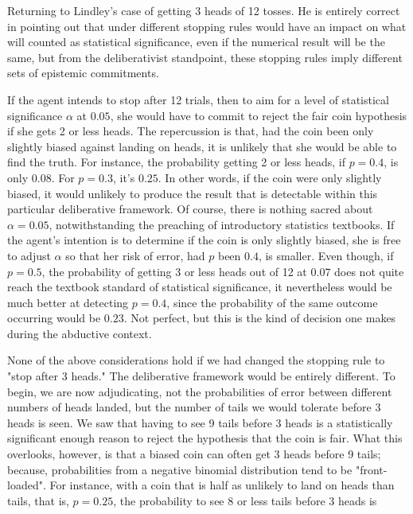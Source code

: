 Returning to Lindley's case of getting 3 heads of 12 tosses. He is
entirely correct in pointing out that under different stopping rules
would have an impact on what will counted as statistical significance,
even if the numerical result will be the same, but from the
deliberativist standpoint, these stopping rules imply different sets of
epistemic commitments.

If the agent intends to stop after 12 trials, then to aim for a level of
statistical significance \(\alpha\) at \(0.05\), she would have to
commit to reject the fair coin hypothesis if she gets 2 or less heads.
The repercussion is that, had the coin been only slightly biased against
landing on heads, it is unlikely that she would be able to find the
truth. For instance, the probability getting 2 or less heads, if
\(p=0.4\), is only \(0.08\). For \(p=0.3\), it's \(0.25\). In other
words, if the coin were only slightly biased, it would unlikely to
produce the result that is detectable within this particular
deliberative framework. Of course, there is nothing sacred about
\(\alpha= 0.05\), notwithstanding the preaching of introductory
statistics textbooks. If the agent's intention is to determine if the
coin is only slightly biased, she is free to adjust \(\alpha\) so that
her risk of error, had \(p\) been \(0.4\), is smaller. Even though, if
\(p=0.5\), the probability of getting 3 or less heads out of 12 at
\(0.07\) does not quite reach the textbook standard of statistical
significance, it nevertheless would be much better at detecting
\(p=0.4\), since the probability of the same outcome occurring would be
\(0.23\). Not perfect, but this is the kind of decision one makes during
the abductive context.

None of the above considerations hold if we had changed the stopping
rule to "stop after 3 heads." The deliberative framework would be
entirely different. To begin, we are now adjudicating, not the
probabilities of error between different numbers of heads landed, but
the number of tails we would tolerate before 3 heads is seen. We saw
that having to see 9 tails before 3 heads is a statistically significant
enough reason to reject the hypothesis that the coin is fair. What this
overlooks, however, is that a biased coin can often get 3 heads before 9
tails; because, probabilities from a negative binomial distribution tend
to be "front-loaded". For instance, with a coin that is half as unlikely
to land on heads than tails, that is, \(p=0.25\), the probability to see
8 or less tails before 3 heads is

